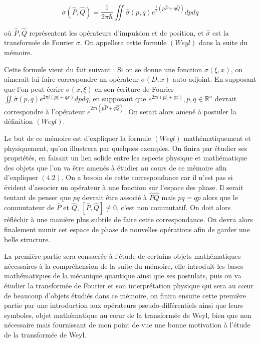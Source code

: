 \documentclass[a4paper, 12pt]{report}
\newcommand{\R}{\mathbb{R}} %
\renewcommand{\.}{\cdot} %
\theoremstyle{break}
\theoremstyle{remark}
\theoremstyle{proofstyle}
\begin{document}
$$\sigma(\hat{P},\hat{Q}) = \frac{1}{2 \pi \hbar} \iint \hat{\sigma} (p,q) e^{ \frac{i}{\hbar}(p\hat{P}+q\hat{Q})} dpdq$$

où $\hat{P}, \hat{Q}$ représentent les opérateurs d'impulsion et de position, et $\hat{\sigma}$ est la transformée de Fourier $\sigma$. On appellera cette formule $(Weyl)$ dans la suite du mémoire.

Cette formule vient du fait suivant :
Si on se donne une fonction $\sigma(\xi, x)$, on aimerait lui faire correspondre un opérateur $\sigma(D,x)$ auto-adjoint. En supposant que l'on peut écrire $\sigma(x, \xi)$ en son écriture de Fourier $\iint \hat{\sigma} (p,q) e^{2 \pi i (p \xi + q x)} dpdq$, en supposant que $e^{2 \pi i (p \xi + qx)}, p, q \in \R^n$ devrait correspondre à l'opérateur $e^{2 \pi i (p\hat{P} + q\hat{Q})}$. On serait alors amené à postuler la définition $(Weyl)$. \vspace{10 pt}

Le but de ce mémoire est d'expliquer la formule $(Weyl)$ mathématiquement et physiquement, qu'on illustrera par quelques exemples. On finira par étudier ses propriétés, en faisant un lien solide entre les aspects physique et mathématique des objets que l'on va être amenés à étudier au cours de ce mémoire afin d'expliquer $(4.2)$. On a besoin de cette correspondance car il n'est pas si évident d'associer un opérateur à une fonction sur l'espace des phase. Il serait tentant de penser que $pq$ devrait être associé à $\hat{P}\hat{Q}$ mais $pq = qp$ alors que le commutateur de $\hat{P}$ et $\hat{Q}$, $[\hat{P}, \hat{Q}] \neq 0$, c'est non commutatif. On doit alors réfléchir à une manière plus subtile de faire cette correspondance. On devra alors finalement munir cet espace de phase de nouvelles opérations afin de garder une belle structure.\vspace{10 pt}



La première partie sera consacrée à l'étude de certains objets mathématiques nécessaires à la compréhension de la suite du mémoire, elle introduit les bases mathématiques de la mécanique quantique ainsi que ses postulats, puis on va étudier la transformée de Fourier et son interprétation physique qui sera au c\oe ur de beaucoup d'objets étudiés dans ce mémoire, on finira ensuite cette première partie par une introduction aux opérateurs pseudo-différentiels ainsi que leurs symboles, objet mathématique au c\oe ur de la transformée de Weyl, bien que non nécessaire mais fournissant de mon point de vue une bonne motivation à l'étude de la transformée de Weyl. \vspace{10pt}
\end{document}

